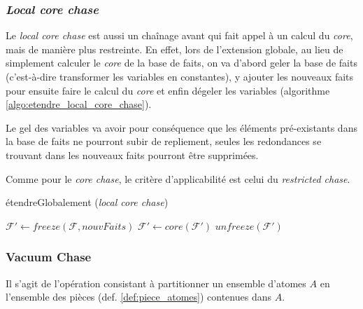 \subsubsection{\textit{Local core chase}}\label{sec:local_core_chase}

Le \textit{local core chase} est aussi un chaînage avant qui fait appel à un calcul du \textit{core}, mais de manière plus restreinte. En effet, lors de l'extension globale, au lieu de simplement calculer le \textit{core} de la base de faits, on va d'abord geler la base de faits (c'est-à-dire transformer les variables en constantes), y ajouter les nouveaux faits pour ensuite faire le calcul du \textit{core} et enfin dégeler les variables (algorithme \ref{algo:etendre_local_core_chase}).
\par Le gel des variables va avoir pour conséquence que les éléments pré-existants dans la base de faits ne pourront subir de repliement, seules les redondances se trouvant dans les nouveaux faits pourront être supprimées.
\par Comme pour le \textit{core chase}, le critère d'applicabilité est celui du \textit{restricted chase}.


\begin{algorithm}[H]\label{algo:etendre_local_core_chase}
\caption{étendreGlobalement (\textit{local core chase})}
\SetAlgoLined
\DontPrintSemicolon
\SetAlgoLined
\DontPrintSemicolon
{}
	$\mathcal{F'} \gets freeze(\mathcal{F}, nouvFaits)$\;
    $\mathcal{F'} \gets core(\mathcal{F'})$\;
    \Return $unfreeze(\mathcal{F'})$
\end{algorithm}

\subsubsection{Vacuum Chase}\label{sec:vacuum_chase}

\begin{definition}[Dépiécer]
Il s'agit de l'opération consistant à partitionner un ensemble d'atomes $A$ en l'ensemble des pièces (def. \ref{def:piece_atomes}) contenues dans $A$.
\end{definition}

